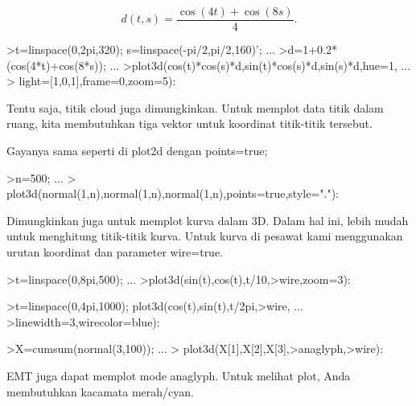 \documentclass[a4paper,10pt]{article}
\begin{document}
\begin{eulernotebook}
\begin{eulercomment}
\begin{eulercomment}
\begin{eulercomment}
\end{eulercomment}
\begin{eulerformula}
\[
d(t,s) = \frac{\cos(4t)+\cos(8s)}{4}.
\]
\end{eulerformula}
\begin{eulerprompt}
>t=linspace(0,2pi,320); s=linspace(-pi/2,pi/2,160)'; ...
>d=1+0.2*(cos(4*t)+cos(8*s)); ...
>plot3d(cos(t)*cos(s)*d,sin(t)*cos(s)*d,sin(s)*d,hue=1, ...
>  light=[1,0,1],frame=0,zoom=5):
\end{eulerprompt}
\begin{eulercomment}
Tentu saja, titik cloud juga dimungkinkan. Untuk memplot data titik
dalam ruang, kita membutuhkan tiga vektor untuk koordinat titik-titik
tersebut.

Gayanya sama seperti di plot2d dengan points=true;
\end{eulercomment}
\begin{eulerprompt}
>n=500;  ...
>  plot3d(normal(1,n),normal(1,n),normal(1,n),points=true,style="."):
\end{eulerprompt}
\begin{eulercomment}
Dimungkinkan juga untuk memplot kurva dalam 3D. Dalam hal ini, lebih
mudah untuk menghitung titik-titik kurva. Untuk kurva di pesawat kami
menggunakan urutan koordinat dan parameter wire=true.
\end{eulercomment}
\begin{eulerprompt}
>t=linspace(0,8pi,500); ...
>plot3d(sin(t),cos(t),t/10,>wire,zoom=3):
\end{eulerprompt}
\begin{eulerprompt}
>t=linspace(0,4pi,1000); plot3d(cos(t),sin(t),t/2pi,>wire, ...
>linewidth=3,wirecolor=blue):
\end{eulerprompt}
\begin{eulerprompt}
>X=cumsum(normal(3,100)); ...
> plot3d(X[1],X[2],X[3],>anaglyph,>wire):
\end{eulerprompt}
\begin{eulercomment}
EMT juga dapat memplot mode anaglyph. Untuk melihat plot, Anda
membutuhkan kacamata merah/cyan.
\end{eulercomment}

\end{eulercomment}
\end{eulercomment}
\end{eulernotebook}
\end{document}
